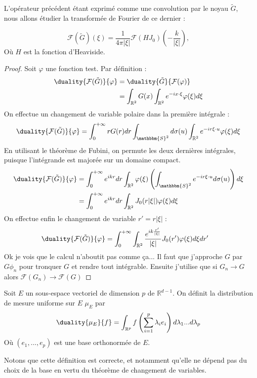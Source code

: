 \documentclass[11pt,a4paper]{article}
\begin{document}
L'opérateur précédent étant exprimé comme une convolution par le noyau $\tilde{G}$, nous allons étudier la transformée de Fourier de ce dernier : 
\begin{Lem} 
\[\mathcal{F}(\tilde{G})(\xi) = \dfrac{1}{4\pi|\xi|} \mathcal{F}(HJ_0)\left(-\dfrac{k}{|\xi|}\right),\]
Où $H$ est la fonction d'Heaviside. 
\end{Lem}
\begin{proof}
Soit $\varphi$ une fonction test. Par définition :
\begin{align*}
\duality{\mathcal{F}(\tilde{G})}{\varphi} &= \duality{\tilde{G}}{\mathcal{F}(\varphi)}\\
 &= \int_{\mathbb{R}^2} G(x) \int_{\mathbb{R}^2} e^{-i x \cdot \xi} \varphi(\xi) d\xi
\end{align*}
On effectue un changement de variable polaire dans la première intégrale : 
\begin{align*}
\duality{\mathcal{F}(\tilde{G})}{\varphi} &= \int_{0}^{+\infty} rG(r)dr \int_{\mathbbm{S}^2} d\sigma(u) \int_{\mathbb{R}^2} e^{-ir \xi \cdot u} \varphi(\xi)d \xi\\
\end{align*}
En utilisant le théorème de Fubini, on permute les deux dernières intégrales, puisque l'intégrande est majorée sur un domaine compact. 
\begin{align*}
\duality{\mathcal{F}(\tilde{G})}{\varphi} &= \int_{0}^{+\infty} e^{ikr}dr \int_{\mathbb{R}^2}\varphi(\xi) \left( \int_{\mathbbm{S}^2}e^{-ir \xi \cdot u} d\sigma(u) \right)d \xi\\
&= \int_{0}^{+\infty}  e^{ikr}dr \int_{\mathbb{R}^2} J_0(r|\xi|) \varphi(\xi) d\xi
\end{align*}
On effectue enfin le changement de variable $r' = r|\xi|$ : 
\begin{align*}
\duality{\mathcal{F}(\tilde{G})}{\varphi} &= \int_{0}^{+\infty}\int_{\mathbb{R}^2} \dfrac{e^{i k \frac{r'}{|\xi|}}}{|\xi|} J_0(r')\varphi(\xi) d\xi dr'
\end{align*}
Ok je vois que le calcul n'aboutit pas comme ça... Il faut que j'approche $G$ par $G\phi_n$ pour tronquer $G$ et rendre tout intégrable. Ensuite j'utilise que si $G_n \to G$ alors $\mathcal{F}(G_n) \to \mathcal{F}(G)$

\end{proof}
\begin{Def} Soit $E$ un sous-espace vectoriel de dimension $p$ de $\mathbb{R}^{d-1}$. On définit la distribution de mesure uniforme sur $E$ $\mu_{E}$ par 
\[\duality{\mu_{E}}{f} = \int_{\mathbb{R}^{p}} f\left(\sum_{i=1}^p \lambda_i e_i\right)d\lambda_1 ...d\lambda_p\]
Où $(e_1,...,e_p)$ est une base orthonormée de $E$.
\end{Def}
Notons que cette définition est correcte, et notamment qu'elle ne dépend pas du choix de la base en vertu du théorème de changement de variables. 
\end{document}

